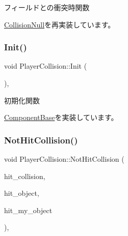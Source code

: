 フィールドとの衝突時関数 



\mbox{\hyperlink{class_collision_null_a75900c2cec4e49336701e2e3c64e5bfe}{Collision\+Null}}を再実装しています。

\mbox{\label{class_player_collision_a3dd6238b75933fd60aee77e92353cc44}} 
\subsubsection{\texorpdfstring{Init()}{Init()}}
{\footnotesize\ttfamily void Player\+Collision\+::\+Init (\begin{DoxyParamCaption}{ }\end{DoxyParamCaption})\hspace{0.3cm}{\ttfamily [override]}, {\ttfamily [virtual]}}



初期化関数 



\mbox{\hyperlink{class_component_base_a125939d6befe42f28886a6523e86b18b}{Component\+Base}}を実装しています。

\mbox{\label{class_player_collision_a21b8f825ea142024212ab5fe3f427ab0}} 
\subsubsection{\texorpdfstring{Not\+Hit\+Collision()}{NotHitCollision()}}
{\footnotesize\ttfamily void Player\+Collision\+::\+Not\+Hit\+Collision (\begin{DoxyParamCaption}\item[{\mbox{\hyperlink{class_collision_base}{Collision\+Base}} $\ast$}]{hit\+\_\+collision,  }\item[{\mbox{\hyperlink{class_collision_object}{Collision\+Object}} $\ast$}]{hit\+\_\+object,  }\item[{\mbox{\hyperlink{class_collision_object}{Collision\+Object}} $\ast$}]{hit\+\_\+my\+\_\+object }\end{DoxyParamCaption})\hspace{0.3cm}{\ttfamily [override]}, {\ttfamily [virtual]}}



